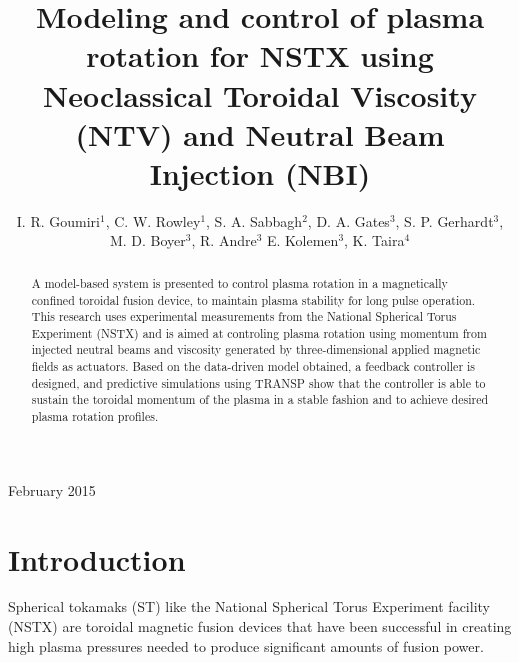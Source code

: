 \documentclass[12pt]{iopart}
\begin{document}
\title[Modeling and control of plasma rotation using NTV and NBI]{Modeling and control of plasma rotation for NSTX using Neoclassical Toroidal Viscosity (NTV) and Neutral Beam Injection (NBI)}

\author{I. R. Goumiri$^1$, C. W. Rowley$^1$, S. A. Sabbagh$^2$, D. A. Gates$^3$, S. P. Gerhardt$^3$, M. D. Boyer$^3$, R. Andre$^3$  E. Kolemen$^3$, K. Taira$^4$ }

 \address{$^1$ Department of Mechanical and Aerospace Engineering, Princeton University, Princeton, NJ 08544, USA}
 \address{$^2$ Department of Applied Physics and Applied Mathematics, Columbia University, New York, NY 10027, USA}
\address{$^3$ Princeton Plasma Physics Laboratory, Princeton, NJ 08544, USA}
\address{$^4$ Florida Center for Advanced Aero-Propulsion, Florida State University, Tallahassee, Florida 32310, USA}

\vspace{10pt}
\begin{indented}
\item[]February 2015
\end{indented}

\begin{abstract}
A model-based system is presented to control plasma rotation in a magnetically confined toroidal fusion device, to maintain plasma stability for long pulse operation. This research uses experimental measurements from the National Spherical Torus Experiment (NSTX) and is aimed at controling plasma rotation using momentum from injected neutral beams and viscosity generated by three-dimensional applied magnetic fields as actuators. Based on the data-driven model obtained, a feedback controller is designed, and predictive simulations using TRANSP show that the controller is able to sustain the toroidal momentum of the plasma in a stable fashion and to achieve desired plasma rotation profiles.
 
\end{abstract}



\section{Introduction}

Spherical tokamaks (ST) like the National Spherical Torus Experiment facility (NSTX) are toroidal magnetic fusion devices that have been successful in creating high plasma pressures needed to produce significant amounts of fusion power. 
\end{document}
